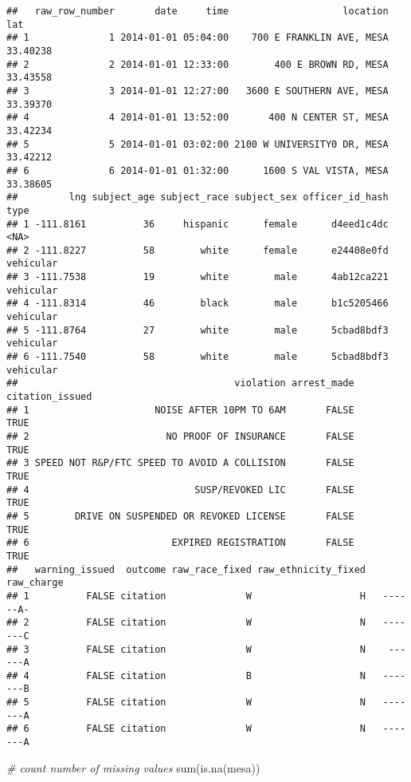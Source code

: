 \documentclass[
]{article}
\newenvironment{Shaded}{\begin{snugshade}}{\end{snugshade}}
\newcommand{\CommentTok}[1]{\textcolor[rgb]{0.56,0.35,0.01}{\textit{#1}}}
\newcommand{\FunctionTok}[1]{\textcolor[rgb]{0.00,0.00,0.00}{#1}}
\newcommand{\NormalTok}[1]{#1}
\begin{document}
\begin{verbatim}
##   raw_row_number       date     time                    location      lat
## 1              1 2014-01-01 05:04:00    700 E FRANKLIN AVE, MESA 33.40238
## 2              2 2014-01-01 12:33:00        400 E BROWN RD, MESA 33.43558
## 3              3 2014-01-01 12:27:00   3600 E SOUTHERN AVE, MESA 33.39370
## 4              4 2014-01-01 13:52:00       400 N CENTER ST, MESA 33.42234
## 5              5 2014-01-01 03:02:00 2100 W UNIVERSITY0 DR, MESA 33.42212
## 6              6 2014-01-01 01:32:00      1600 S VAL VISTA, MESA 33.38605
##         lng subject_age subject_race subject_sex officer_id_hash      type
## 1 -111.8161          36     hispanic      female      d4eed1c4dc      <NA>
## 2 -111.8227          58        white      female      e24408e0fd vehicular
## 3 -111.7538          19        white        male      4ab12ca221 vehicular
## 4 -111.8314          46        black        male      b1c5205466 vehicular
## 5 -111.8764          27        white        male      5cbad8bdf3 vehicular
## 6 -111.7540          58        white        male      5cbad8bdf3 vehicular
##                                      violation arrest_made citation_issued
## 1                      NOISE AFTER 10PM TO 6AM       FALSE            TRUE
## 2                        NO PROOF OF INSURANCE       FALSE            TRUE
## 3 SPEED NOT R&P/FTC SPEED TO AVOID A COLLISION       FALSE            TRUE
## 4                             SUSP/REVOKED LIC       FALSE            TRUE
## 5        DRIVE ON SUSPENDED OR REVOKED LICENSE       FALSE            TRUE
## 6                         EXPIRED REGISTRATION       FALSE            TRUE
##   warning_issued  outcome raw_race_fixed raw_ethnicity_fixed raw_charge
## 1          FALSE citation              W                   H   ------A-
## 2          FALSE citation              W                   N   -------C
## 3          FALSE citation              W                   N    ------A
## 4          FALSE citation              B                   N   -------B
## 5          FALSE citation              W                   N   -------A
## 6          FALSE citation              W                   N   -------A
\end{verbatim}

\begin{Shaded}
\begin{Highlighting}[]
\CommentTok{\# count number of missing values}
\FunctionTok{sum}\NormalTok{(}\FunctionTok{is.na}\NormalTok{(mesa))}
\end{Highlighting}
\end{Shaded}
\end{document}
